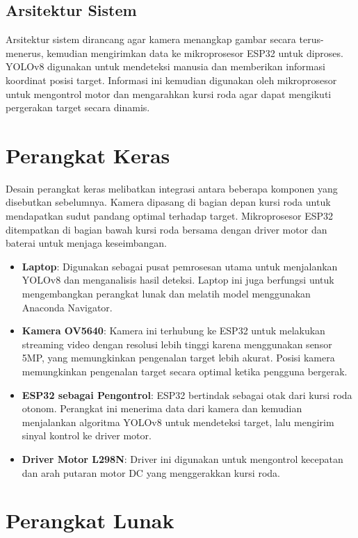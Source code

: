 \subsection{Arsitektur Sistem}
\label{subsec:arsitektursistem}

Arsitektur sistem dirancang agar kamera menangkap gambar secara terus-menerus, kemudian mengirimkan data ke mikroprosesor ESP32 untuk diproses. YOLOv8 digunakan untuk mendeteksi manusia dan memberikan informasi koordinat posisi target. Informasi ini kemudian digunakan oleh mikroprosesor untuk mengontrol motor dan mengarahkan kursi roda agar dapat mengikuti pergerakan target secara dinamis.

\section{Perangkat Keras}
\label{sec:perangkathardware}

Desain perangkat keras melibatkan integrasi antara beberapa komponen yang disebutkan sebelumnya. Kamera dipasang di bagian depan kursi roda untuk mendapatkan sudut pandang optimal terhadap target. Mikroprosesor ESP32 ditempatkan di bagian bawah kursi roda bersama dengan driver motor dan baterai untuk menjaga keseimbangan.

\begin{itemize}[nolistsep]
    \item \textbf{Laptop}: Digunakan sebagai pusat pemrosesan utama untuk menjalankan YOLOv8 dan menganalisis hasil deteksi. Laptop ini juga berfungsi untuk mengembangkan perangkat lunak dan melatih model menggunakan Anaconda Navigator.
    \item \textbf{Kamera OV5640}: Kamera ini terhubung ke ESP32 untuk melakukan streaming video dengan resolusi lebih tinggi karena menggunakan sensor 5MP, yang memungkinkan pengenalan target lebih akurat. Posisi kamera memungkinkan pengenalan target secara optimal ketika pengguna bergerak.
    \item \textbf{ESP32 sebagai Pengontrol}: ESP32 bertindak sebagai otak dari kursi roda otonom. Perangkat ini menerima data dari kamera dan kemudian menjalankan algoritma YOLOv8 untuk mendeteksi target, lalu mengirim sinyal kontrol ke driver motor.
    \item \textbf{Driver Motor L298N}: Driver ini digunakan untuk mengontrol kecepatan dan arah putaran motor DC yang menggerakkan kursi roda.
\end{itemize}

\section{Perangkat Lunak}
\label{sec:perangkatlunak}

